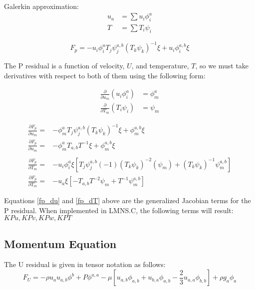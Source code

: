 Galerkin approximation:
\begin{align*}
    u_a &= \sum u_i \phi_i^a\\
    T &= \sum T_i \psi_i
\end{align*}

\begin{equation}
    F_p = -u_i \phi_i^a T_j \psi_j^{a,b} (T_k \psi_k)^{-1} \xi + u_i \phi_i^{a,b} \xi
\end{equation}

The P residual is a function of velocity, $U$, and temperature, $T$, so we must take derivatives with respect to both of them using the following form:

\begin{align*}
    \frac{\partial}{\partial u_m} (u_i \phi_i^a) &= \phi_m^a \\
    \frac{\partial}{\partial T_m} (T_i \psi_i) &= \psi_m
\end{align*}

\begin{align}
    \frac{\partial F_p}{\partial u_m} = &-\phi_m^{a} T_j \psi_j^{a,b} (T_k \psi_k)^{-1} \xi + \phi_m^{a,b} \xi \nonumber \\
    \frac{\partial F_p}{\partial u_m} = &-\phi_m^{a} T_{a,b} T^{-1} \xi + \phi_m^{a,b} \xi \label {fp_du}\\ 
    \nonumber \\
    \frac{\partial F_p}{\partial T_m} = &-u_i \phi_i^a \xi \left [ T_j \psi_j^{a,b} (-1) (T_k \psi_k)^{-2} (\psi_m) + (T_k \psi_k)^{-1} \psi_m^{a,b} \right ] \nonumber \\
    \frac{\partial F_p}{\partial T_m} = &-u_a \xi \left [ -T_{a,b} T^{-2} \psi_m + T^{-1} \psi_m^{a,b} \right ] \label{fp_dT}
\end{align}

Equations \ref{fp_du} and \ref{fp_dT} above are the generalized Jacobian terms for the P residual. When implemented in LMNS.C, the following terms will result:\\
$KPu, KPv, KPw, KPT$

\newpage
\subsection{Momentum Equation}
The U residual is given in tensor notation as follows:
\begin{equation}
    F_U = -\rho u_a u_{a,b} \phi^b + P \phi^{a,a} - \mu \left [u_{a,b} \phi_{a,b} + u_{b,a} \phi_{a,b} - \frac{2}{3} u_{a,a} \phi_{b,b} \right ] + \rho g_a \phi_a
\end{equation}

